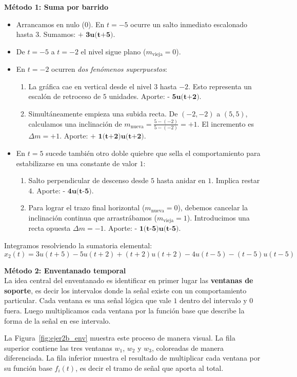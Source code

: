 \documentclass[10pt,a4paper]{article}
\begin{document}
\begin{enumerate}[label=\textbf{\alph*)}]
		\textbf{Método 1: Suma por barrido}
		\begin{itemize}
		    \item Arrancamos en nulo ($0$). En $t=-5$ ocurre un salto inmediato escalonado hasta $3$. Sumamos: $\textbf{+ 3u(t+5)}$.
		    \item De $t=-5$ a $t=-2$ el nivel sigue plano ($m_{\text{vieja}}=0$).
		    \item En $t=-2$ ocurren \textit{dos fenómenos superpuestos}:
		    \begin{enumerate}
		        \item La gráfica cae en vertical desde el nivel $3$ hasta $-2$. Esto representa un escalón de retroceso de $5$ unidades. Aporte: $\textbf{- 5u(t+2)}$.
		        \item Simultáneamente empieza una subida recta. De $(-2,-2)$ a $(5,5)$, calculamos una inclinación de $m_{\text{nueva}} = \frac{5 - (-2)}{5 - (-2)} = +1$. El incremento es $\Delta m = +1$. Aporte: $\textbf{+ 1(t+2)u(t+2)}$.
		    \end{enumerate}
		    \item En $t=5$ sucede también otro doble quiebre que sella el comportamiento para estabilizarse en una constante de valor $1$:
		    \begin{enumerate}
		        \item Salto perpendicular de descenso desde $5$ hasta anidar en $1$. Implica restar $4$. Aporte: $\textbf{- 4u(t-5)}$.
		        \item Para lograr el trazo final horizontal ($m_{\text{nueva}}=0$), debemos cancelar la inclinación continua que arrastrábamos ($m_{\text{vieja}}=1$). Introducimos una recta opuesta $\Delta m = -1$. Aporte: $\textbf{- 1(t-5)u(t-5)}$.
		    \end{enumerate}
		\end{itemize}
		Integramos resolviendo la sumatoria elemental:
		\[ x_2(t) = 3u(t+5) - 5u(t+2) + (t+2)u(t+2) - 4u(t-5) - (t-5)u(t-5) \]

        \textbf{Método 2: Enventanado temporal} \\
        La idea central del enventanado es identificar en primer lugar las \textbf{ventanas de soporte}, es decir los intervalos donde la señal existe con un comportamiento particular. Cada ventana es una señal lógica que vale $1$ dentro del intervalo y $0$ fuera. Luego multiplicamos cada ventana por la función base que describe la forma de la señal en ese intervalo.

        La Figura~\ref{fig:ejer2b_env} muestra este proceso de manera visual. La fila superior contiene las tres ventanas $w_1$, $w_2$ y $w_3$, coloreadas de manera diferenciada. La fila inferior muestra el resultado de multiplicar cada ventana por su función base $f_i(t)$, es decir el tramo de señal que aporta al total.


\end{enumerate}
\end{document}
